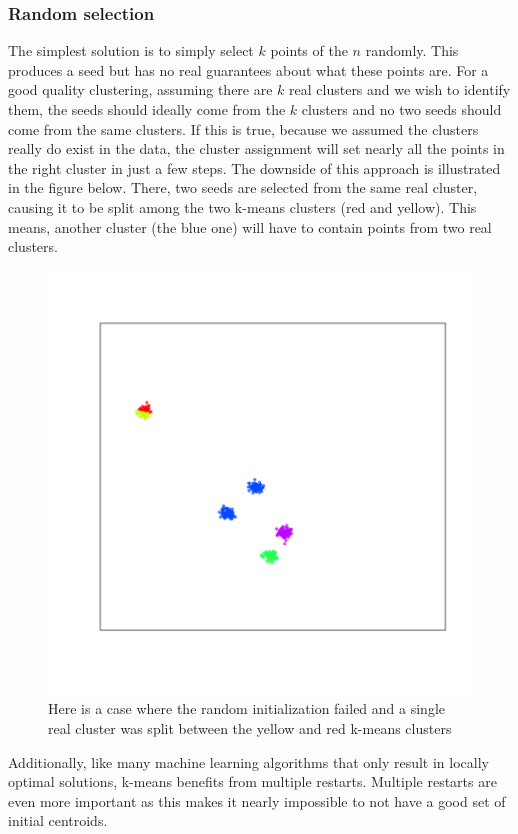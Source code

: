 \documentclass{article}
\begin{document}
\subsubsection{Random selection}
The simplest solution is to simply select $k$ points of the $n$ randomly. This
produces a seed but has no real guarantees about what these points are.
For a good quality clustering, assuming there are $k$ real clusters and we wish
to identify them, the seeds should ideally come from the $k$ clusters and no
two seeds should come from the same clusters.
If this is true, because we assumed the clusters really do exist in the data,
the cluster assignment will set nearly all the points in the right cluster in
just a few steps.
The downside of this approach is illustrated in the figure below. There, two
seeds are selected from the same real cluster, causing it to be split among the
two k-means clusters (red and yellow). This means, another cluster (the blue
one) will have to contain points from two real clusters.
\begin{figure}[H]
    \caption{Here is a case where the random initialization failed and a
    single real cluster was split between the yellow and red k-means clusters}
    \includegraphics[scale=0.7]{kmfail.png}
\end{figure}
Additionally, like many machine learning algorithms that only result in locally
optimal solutions, k-means benefits from multiple restarts. Multiple restarts
are even more important as this makes it nearly impossible to not have a good
set of initial centroids.
\end{document}
